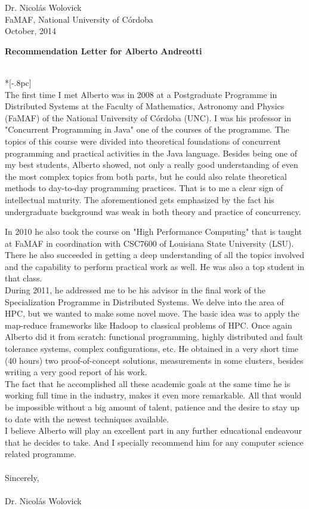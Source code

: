 \documentclass[letter,12pt,english]{article}
\begin{document}
{
\raggedleft{}
Dr. Nicol\'as Wolovick \\
FaMAF, National University of C\'ordoba \\
October, 2014 \\
}

{ 

\large
\bf Recommendation Letter for Alberto Andreotti} \\*[-.8pc]
\\

The first time I met Alberto was in 2008 at a Postgraduate Programme in Distributed Systems at the Faculty of Mathematics, Astronomy and Physics (FaMAF) of the National University of Córdoba (UNC). I was his professor in "Concurrent Programming in Java" one of the courses of the programme.
The topics of this course were divided into theoretical foundations of concurrent programming and practical activities in the Java language. Besides being one of my best students, Alberto showed, not only a really good understanding of even the most complex topics from both parts, but he could also relate theoretical methods to day-to-day programming practices. That is to me a clear sign of intellectual maturity. The aforementioned gets emphasized by the fact his undergraduate background was weak in both theory and practice of concurrency.

In 2010 he also took the course on "High Performance Computing" that is taught at FaMAF in coordination with CSC7600 of Louisiana State University (LSU). There he also succeeded in getting a deep understanding of all the topics involved and the capability to perform practical work as well. He was also a top student in that class.
\\
During 2011, he addressed me to be his advisor in the final work of the Specialization Programme in Distributed Systems. We delve into the area of HPC, but we wanted to make some novel move. The basic idea was to apply the map-reduce frameworks like Hadoop to classical problems of HPC. Once again Alberto did it from scratch: functional programming, highly distributed and fault tolerance systems, complex configurations, etc. He obtained in a very short time (40 hours) two proof-of-concept solutions, measurements in some clusters, besides writing a very good report of his work.
\\
The fact that he accomplished all these academic goals at the same time he is working full time in the industry, makes it even more remarkable. All that would be impossible without a big amount of talent, patience and the desire to stay up to date with the newest techniques available.
\\
I believe Alberto will play an excellent part in any further educational endeavour that he decides to take. And I specially recommend him for any computer science related programme.
\\
\\
Sincerely, 
\\
\\
Dr. Nicol\'as Wolovick
\end{document}
